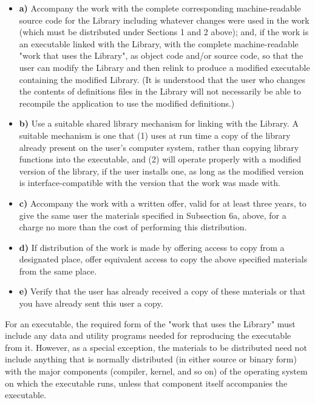 \begin{itemize}
\item {\bf a)} Accompany the work with the complete corresponding 
   machine-readable source code for the Library including whatever  changes were
   used in the work (which must be distributed under  Sections 1 and 2 above);
and, if the work is an executable linked  with the Library, with the complete
machine-readable "work that  uses the Library", as object code and/or source
code, so that the  user can modify the Library and then relink to produce a
modified  executable containing the modified Library. (It is understood  that
the user who changes the contents of definitions files in the  Library will
not necessarily be able to recompile the application  to use the modified
definitions.)  
\item {\bf b)} Use a suitable shared library mechanism for linking with the 
   Library. A suitable mechanism is one that (1) uses at run time a  copy of the
   library already present on the user's computer system,  rather than copying
library functions into the executable, and (2)  will operate properly with a
modified version of the library, if  the user installs one, as long as the
modified version is  interface-compatible with the version that the work was
made with.  
\item {\bf c)} Accompany the work with a written offer, valid for at  least
   three years, to give the same user the materials  specified in Subsection 6a,
   above, for a charge no more  than the cost of performing this distribution.  
\item {\bf d)} If distribution of the work is made by offering access to copy 
   from a designated place, offer equivalent access to copy the above  specified
   materials from the same place.  
\item {\bf e)} Verify that the user has already received a copy of these 
   materials or that you have already sent this user a copy. 
   \end{itemize}

For an executable, the required form of the "work that uses the Library"
must include any data and utility programs needed for reproducing the
executable from it. However, as a special exception, the materials to be
distributed need not include anything that is normally distributed (in either
source or binary form) with the major components (compiler, kernel, and so on)
of the operating system on which the executable runs, unless that component
itself accompanies the executable. 

